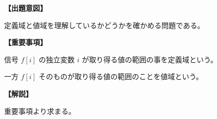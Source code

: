 \noindent \textbf{【出題意図】}

\noindent 定義域と値域を理解しているかどうかを確かめる問題である。

\vspace{1em}
\noindent \textbf{【重要事項】}

\bigskip
\noindent 信号 $f[i]$ の独立変数 $i$ が取り得る値の範囲の事を定義域という。

\noindent 一方 $f[i]$ そのものが取り得る値の範囲のことを値域という。

\vspace{1em}
\noindent \textbf{【解説】}

\noindent 重要事項より求まる。

